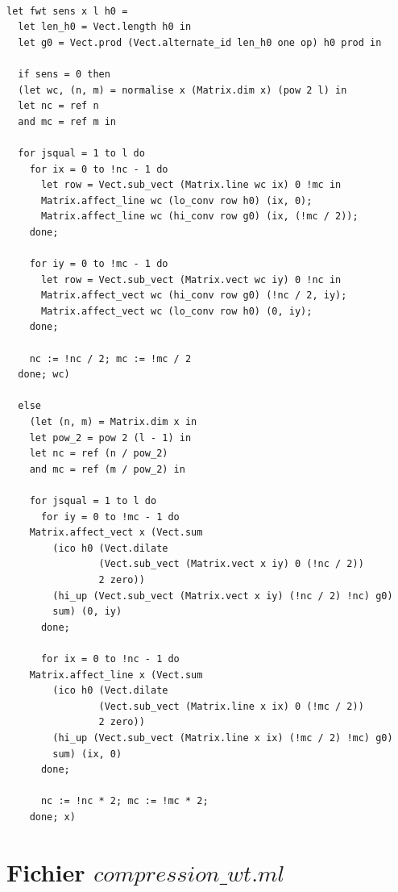 \documentclass[a4paper,10pt]{report}
\theoremstyle{break}
\begin{document}
\newpage
    \begin{lstlisting}

let fwt sens x l h0 =
  let len_h0 = Vect.length h0 in 
  let g0 = Vect.prod (Vect.alternate_id len_h0 one op) h0 prod in

  if sens = 0 then
  (let wc, (n, m) = normalise x (Matrix.dim x) (pow 2 l) in
  let nc = ref n
  and mc = ref m in

  for jsqual = 1 to l do
    for ix = 0 to !nc - 1 do
      let row = Vect.sub_vect (Matrix.line wc ix) 0 !mc in
      Matrix.affect_line wc (lo_conv row h0) (ix, 0);
      Matrix.affect_line wc (hi_conv row g0) (ix, (!mc / 2));
    done;

    for iy = 0 to !mc - 1 do
      let row = Vect.sub_vect (Matrix.vect wc iy) 0 !nc in
      Matrix.affect_vect wc (hi_conv row g0) (!nc / 2, iy);
      Matrix.affect_vect wc (lo_conv row h0) (0, iy);
    done;

    nc := !nc / 2; mc := !mc / 2
  done; wc)

  else
    (let (n, m) = Matrix.dim x in
    let pow_2 = pow 2 (l - 1) in
    let nc = ref (n / pow_2)
    and mc = ref (m / pow_2) in

    for jsqual = 1 to l do
      for iy = 0 to !mc - 1 do
	Matrix.affect_vect x (Vect.sum 
		(ico h0 (Vect.dilate 
			    (Vect.sub_vect (Matrix.vect x iy) 0 (!nc / 2)) 
			    2 zero)) 
		(hi_up (Vect.sub_vect (Matrix.vect x iy) (!nc / 2) !nc) g0) 
		sum) (0, iy)
      done;

      for ix = 0 to !nc - 1 do
	Matrix.affect_line x (Vect.sum 
		(ico h0 (Vect.dilate 
			    (Vect.sub_vect (Matrix.line x ix) 0 (!mc / 2)) 
			    2 zero)) 
		(hi_up (Vect.sub_vect (Matrix.line x ix) (!mc / 2) !mc) g0) 
		sum) (ix, 0)
      done;

      nc := !nc * 2; mc := !mc * 2;
    done; x)

    \end{lstlisting}

\newpage
    
  \section*{Fichier $compression\_wt.ml$}
  
\end{document}
